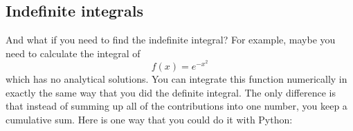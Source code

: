 %
%
%
%
%
%
%
%
%
%
%

\subsection*{Indefinite integrals}

And what if you need to find the indefinite integral? For example,
maybe you need to calculate the integral of
\begin{equation}
f(x) = e^{-x^2}
\end{equation}
which has no analytical solutions. You can integrate this function
numerically in exactly the same way that you did the definite
integral.  The only difference is that instead of summing up all of
the contributions into one number, you keep a cumulative sum.  Here is
one way that you could do it with Python:


